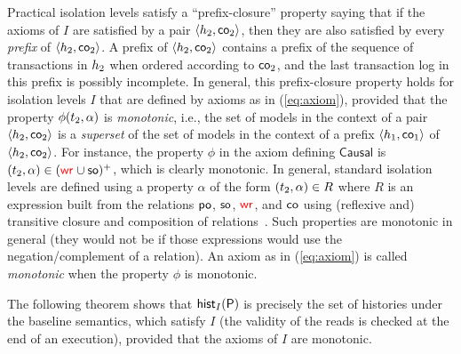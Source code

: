 Practical isolation levels satisfy a ``prefix-closure'' property saying that if the axioms of $I$ are satisfied by a pair $\tup{\hist_2,\co_2}$, then they are also satisfied by every \emph{prefix} of $\tup{\hist_2,\co_2}$. A prefix of $\tup{\hist_2,\co_2}$ contains a prefix of the sequence of transactions in $\hist_2$ when ordered according to $\co_2$, and the last transaction log in this prefix is possibly incomplete.
In general, this prefix-closure property holds for isolation levels $I$ that are defined by axioms as in (\ref{eq:axiom}), provided that the property $\phi(\tr_2,\alpha)$ is \emph{monotonic}, i.e., the set of models in the context of a pair $\tup{\hist_2,\co_2}$ is a \emph{superset} of the set of models in the context of a prefix $ \tup{\hist_1,\co_1}$ of $\tup{\hist_2,\co_2}$. For instance, the property $\phi$ in the axiom defining $\mathsf{Causal}$ is $(\tr_2,\alpha)\in (\wro \cup \so)^+$, which is clearly monotonic. In general, standard isolation levels are defined using a property $\alpha$ of the form $(\tr_2,\alpha)\in R$ where $R$ is an expression built from the relations $\po$, $\so$, $\wro$, and $\co$ using (reflexive and) transitive closure and composition of relations~\cite{DBLP:journals/pacmpl/BiswasE19}. Such properties are monotonic in general (they would not be if those expressions would use the negation/complement of a relation).  An axiom as in (\ref{eq:axiom}) is called \emph{monotonic} when the property $\phi$ is monotonic. 

The following theorem shows that $\histOf[I]{\prog}$ is precisely the set of histories under the baseline semantics, which satisfy $I$ (the validity of the reads is checked at the end of an execution), provided that the axioms of $I$ are monotonic.


